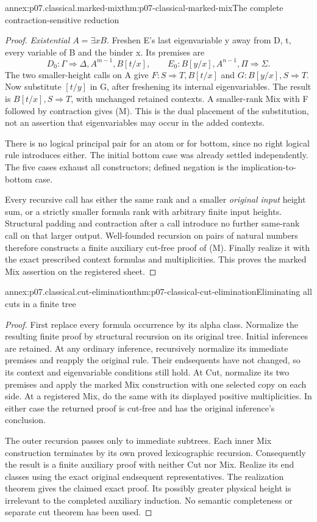 \begin{annexitem}{annex:p07.classical.marked-mix}{thm:p07-classical-marked-mix}{The complete contraction-sensitive reduction}
\begin{proof}
\emph{Existential \(A=\exists xB\).}
Freshen E's last eigenvariable y away from D, t, every variable of B
and the binder x. Its premises are
\[
 D_0:\Gamma\Rightarrow\Delta,A^{m-1},B[t/x],\qquad
 E_0:B[y/x],A^{n-1},\Pi\Rightarrow\Sigma.
\]
The two smaller-height calls on A give
\(F:S\Rightarrow T,B[t/x]\) and \(G:B[y/x],S\Rightarrow T\).
Now substitute \([t/y]\) in G, after freshening its internal
eigenvariables. The result is \(B[t/x],S\Rightarrow T\), with
unchanged retained contexts. A smaller-rank Mix with F followed by
contraction gives (M). This is the dual placement of the substitution,
not an assertion that eigenvariables may occur in the added contexts.

There is no logical principal pair for an atom or for bottom, since
no right logical rule introduces either. The initial bottom case was
already settled independently. The five cases exhaust all constructors;
defined negation is the implication-to-bottom case.

Every recursive call has either the same rank and a smaller
\emph{original input} height sum, or a strictly smaller formula rank
with arbitrary finite input heights. Structural padding and contraction
after a call introduce no further same-rank call on that larger output.
Well-founded recursion on pairs of natural numbers therefore constructs
a finite auxiliary cut-free proof of (M). Finally realize it with the
exact prescribed context formulas and multiplicities. This proves the
marked Mix assertion on the registered sheet.
\end{proof}
\end{annexitem}

\begin{annexitem}{annex:p07.classical.cut-elimination}{thm:p07-classical-cut-elimination}{Eliminating all cuts in a finite tree}
\begin{proof}
First replace every formula occurrence by its alpha class. Normalize the
resulting finite proof by structural recursion on its original tree.
Initial inferences are retained. At any ordinary inference, recursively
normalize its immediate premises and reapply the original rule. Their
endsequents have not changed, so its context and eigenvariable conditions
still hold. At Cut, normalize its two premises and apply the marked Mix
construction with one selected copy on each side. At a registered Mix,
do the same with its displayed positive multiplicities. In either case
the returned proof is cut-free and has the original inference's conclusion.

The outer recursion passes only to immediate subtrees. Each inner Mix
construction terminates by its own proved lexicographic recursion.
Consequently the result is a finite auxiliary proof with neither Cut
nor Mix. Realize its end classes using the exact original endsequent
representatives. The realization theorem gives the claimed exact proof.
Its possibly greater physical height is irrelevant to the completed
auxiliary induction. No semantic completeness or separate cut theorem
has been used.
\end{proof}
\end{annexitem}

